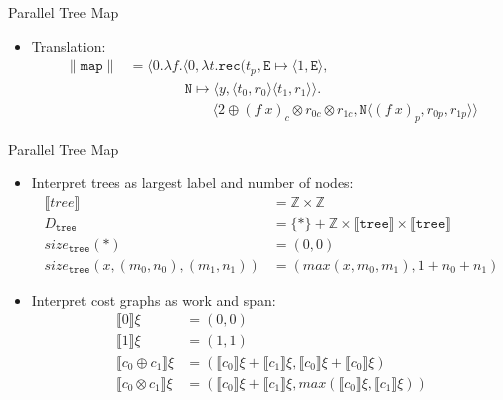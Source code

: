 \documentclass[pdf]{beamer}
\newcommand{\T}[1]{\texttt{#1}}
\newcommand{\LP}{\langle}
\newcommand{\RP}{\rangle}
\newcommand{\LB}{\llbracket}
\newcommand{\RB}{\rrbracket}
\newcommand{\quadthree}{\qquad\quad}
\newcommand{\quadfour}{\quadthree\quad}
\newcommand{\quadfive}{\quadfour\quad}
\newcommand{\quadsix}{\quadfive\quad}
\begin{document}
\begin{frame}{Parallel Tree Map}
  \begin{itemize}
      \vfill
    \item Translation:
      \begin{align*}
      \|\T{map}\| &= \LP 0.\lambda f.\LP 0,\lambda t.\T{rec}(t_p, \T{E} \mapsto \LP 1, \T{E}\RP, \\
  &\quadfour \T{N} \mapsto \LP y, \LP t_0, r_0 \RP \LP t_1, r_1 \RP \RP.  \\
  &\quadsix \LP 2 \oplus (f\ x)_c \otimes r_{0c} \otimes r_{1c}, \T{N} \LP (f\ x)_p, r_{0p}, r_{1p}\RP\RP
      \end{align*}
      \vfill
  \end{itemize}
\end{frame}

\begin{frame}{Parallel Tree Map}
  \begin{itemize}
      \vfill
    \item Interpret trees as largest label and number of nodes:
      \begin{align*}
        \LB tree \RB &= \mathbb{Z} \times \mathbb{Z} \\
        D_\T{tree} &= \{\ast\} + \mathbb{Z} \times \LB \T{tree} \RB \times \LB \T{tree} \RB \\
        size_\T{tree}(\ast) &= (0, 0) \\
        size_\T{tree}(x, (m_0, n_0), (m_1, n_1)) &= (max(x, m_0, m_1), 1 + n_0 + n_1)
      \end{align*}
      \vfill
    \item Interpret cost graphs as work and span:
      \begin{align*}
        \LB 0 \RB\xi &= (0,0) \\
        \LB 1 \RB\xi &= (1,1) \\
        \LB c_0 \oplus c_1 \RB\xi &= (\LB c_0 \RB\xi + \LB c_1 \RB\xi, \LB c_0 \RB\xi + \LB c_0 \RB \xi)\\
        \LB c_0 \otimes c_1 \RB\xi &= (\LB c_0 \RB\xi + \LB c_1 \RB\xi, max(\LB c_0 \RB\xi, \LB c_1 \RB\xi))
      \end{align*}
      \vfill
  \end{itemize}
\end{frame}
\end{document}
